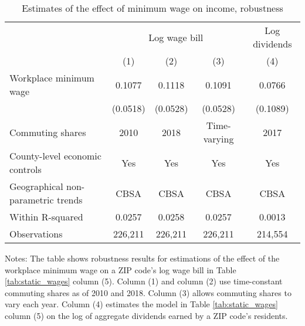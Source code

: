\begin{table}[]
    \caption{Estimates of the effect of minimum wage on income, robustness}
    \label{tab:static_wages_robustness}

    \begin{tabular}{@{}lcccc@{}}
        \toprule
                                        & \multicolumn{3}{c}{Log wage bill} & Log dividends      \\ \cmidrule(l){2-5} 
                                        & (1)       & (2)      & (3)          & (4)              \\ \midrule
        Workplace minimum wage             & 0.1077   & 0.1118    & 0.1091       & 0.0766            \\
                                        & (0.0518) & (0.0528)  & (0.0528)     & (0.1089)          \\ \midrule
        Commuting shares                   & 2010     & 2018      & Time-varying & 2017              \\
        County-level economic controls     & Yes      & Yes       & Yes          & Yes               \\
        Geographical non-parametric trends & CBSA     & CBSA      & CBSA         & CBSA              \\
        Within R-squared                   & 0.0257   & 0.0258    & 0.0257        & 0.0013              \\
        Observations                       & 226,211  & 226,211   & 226,211       & 214,554              \\ \bottomrule
    \end{tabular}
    
    \begin{minipage}{.95\textwidth} \footnotesize
        \vspace{2mm}
        Notes: The table shows robustness results for estimations of the effect of the workplace
        minimum wage on a ZIP code's log wage bill in Table \ref{tab:static_wages} column (5).
        Column (1) and column (2) use time-constant commuting shares as of 2010 and 2018.
        Column (3) allows commuting shares to vary each year.
        Column (4) estimates the model in Table \ref{tab:static_wages} column (5) on the log
        of aggregate dividends earned by a ZIP code's residents.
    \end{minipage}
\end{table}
